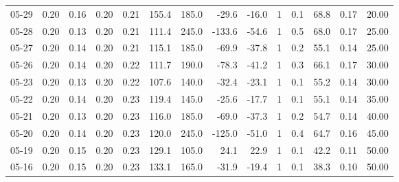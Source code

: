 \begin{threeparttable}
{\begin{tabular}{lrrrrrrrrrrrrr}
  05-29 &          0.20 &          0.16 &          0.20 &        0.21 &               155.4 &               185.0 &      -29.6 &        -16.0 &              1 &                 0.1 &             68.8 &            0.17 &                  20.00 \\
  05-28 &          0.20 &          0.13 &          0.20 &        0.21 &               111.4 &               245.0 &     -133.6 &        -54.6 &              1 &                 0.5 &             68.0 &            0.17 &                  25.00 \\
  05-27 &          0.20 &          0.14 &          0.20 &        0.21 &               115.1 &               185.0 &      -69.9 &        -37.8 &              1 &                 0.2 &             55.1 &            0.14 &                  25.00 \\
  05-26 &          0.20 &          0.14 &          0.20 &        0.22 &               111.7 &               190.0 &      -78.3 &        -41.2 &              1 &                 0.3 &             66.1 &            0.17 &                  30.00 \\
  05-23 &          0.20 &          0.13 &          0.20 &        0.22 &               107.6 &               140.0 &      -32.4 &        -23.1 &              1 &                 0.1 &             55.2 &            0.14 &                  30.00 \\
  05-22 &          0.20 &          0.14 &          0.20 &        0.23 &               119.4 &               145.0 &      -25.6 &        -17.7 &              1 &                 0.1 &             55.1 &            0.14 &                  35.00 \\
  05-21 &          0.20 &          0.13 &          0.20 &        0.23 &               116.0 &               185.0 &      -69.0 &        -37.3 &              1 &                 0.2 &             54.7 &            0.14 &                  40.00 \\
  05-20 &          0.20 &          0.14 &          0.20 &        0.23 &               120.0 &               245.0 &     -125.0 &        -51.0 &              1 &                 0.4 &             64.7 &            0.16 &                  45.00 \\
  05-19 &          0.20 &          0.15 &          0.20 &        0.23 &               129.1 &               105.0 &       24.1 &         22.9 &              1 &                 0.1 &             42.2 &            0.11 &                  50.00 \\
  05-16 &          0.20 &          0.15 &          0.20 &        0.23 &               133.1 &               165.0 &      -31.9 &        -19.4 &              1 &                 0.1 &             38.3 &            0.10 &                  50.00 \\

\end{tabular}}
\end{threeparttable}
